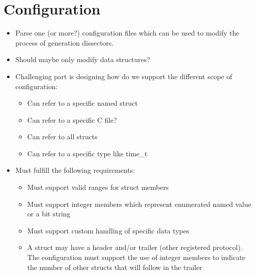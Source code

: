 \section{Configuration}
\begin{itemize}
	\item Parse one (or more?) configuration files which can be used to modify the process of generation dissectors.
	\item Should maybe only modify data structures?
	\item Challenging part is designing how do we support the different scope of configuration: 
	\begin{itemize}
		\item Can refer to a specific named struct
		\item Can refer to a specific C file?
		\item Can refer to all structs
		\item Can refer to a specific type like time\_t
	\end{itemize}
	\item Must fulfill the following requirements: 
	\begin{itemize}
        		\item Must support valid ranges for struct members
        		\item Must support integer members which represent enumerated named value or a bit string
        		\item Must support custom handling of specific data types
        		\item A struct may have a header and/or trailer (other registered protocol). The configuration must support the use of integer members to indicate the number of other structs that will follow in the trailer
	\end{itemize}
\end{itemize}

